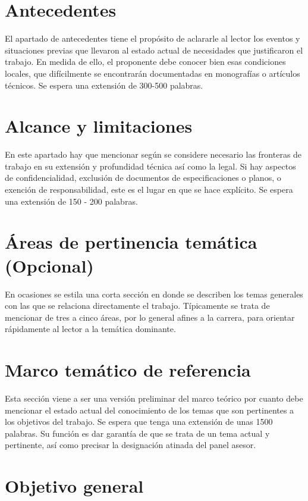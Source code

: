 \documentclass[letterpaper,11pt]{Proposal}
\begin{document}
\section{Antecedentes}
El apartado de antecedentes tiene el propósito de aclararle al lector los eventos y situaciones previas que llevaron al estado actual de necesidades que justificaron el trabajo. En medida de ello, el proponente debe conocer bien esas condiciones locales, que difícilmente se encontrarán documentadas en monografías o artículos técnicos. Se espera una extensión de 300-500 palabras.

\section{Alcance y limitaciones}

En este apartado hay que mencionar según se considere necesario las fronteras de trabajo en su extensión y profundidad técnica así como la legal. Si hay aspectos de confidencialidad, exclusión de documentos de especificaciones o planos, o exención de responsabilidad, este es el lugar en que se hace explícito. Se espera una extensión de 150 - 200 palabras.

\section{Áreas de pertinencia temática (Opcional)}

En ocasiones se estila una corta sección en donde se describen los temas generales con las que se relaciona directamente el trabajo. Típicamente se trata de mencionar de tres a cinco áreas, por lo general afines a la carrera, para orientar rápidamente al lector a la temática dominante.

\section{Marco temático de referencia}

Esta sección viene a ser una versión preliminar del marco teórico por cuanto debe mencionar el estado actual del conocimiento de los temas que son pertinentes a los objetivos del trabajo. Se espera que tenga una extensión de unas 1500 palabras. Su función es dar garantía de que se trata de un tema actual y pertinente, así como precisar la designación atinada del panel asesor.

\section{Objetivo general}
\end{document}
